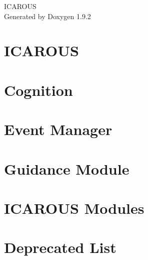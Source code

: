 \documentclass[twoside]{book}
\newcommand{\+}{\discretionary{\mbox{\scriptsize$\hookleftarrow$}}{}{}}
\newcommand{\clearemptydoublepage}{%
    \newpage{\pagestyle{empty}\cleardoublepage}%
  }
\begin{document}
  \raggedbottom
    \hypersetup{pageanchor=false,
                bookmarksnumbered=true,
                pdfencoding=unicode
               }
  \begin{titlepage}
  \vspace*{7cm}
  \begin{center}%
  {\Large ICAROUS}\\
  \vspace*{1cm}
  {\large Generated by Doxygen 1.9.2}\\
  \end{center}
  \end{titlepage}
  \clearemptydoublepage
  \tableofcontents
  \clearemptydoublepage
  \hypersetup{pageanchor=true}
\chapter{ICAROUS}
\label{index}\hypertarget{index}{}
\chapter{Cognition}
\label{md__modules__core__cognition__requirements_design}

\chapter{Event Manager}
\label{md__modules__core__event_manager__requirements_design}

\chapter{Guidance Module}
\label{md__modules__core__guidance__r_e_a_d_m_e}

\chapter{ICAROUS Modules}
\label{md__modules__r_e_a_d_m_e}

\chapter{Deprecated List}
\label{deprecated}

\end{document}
